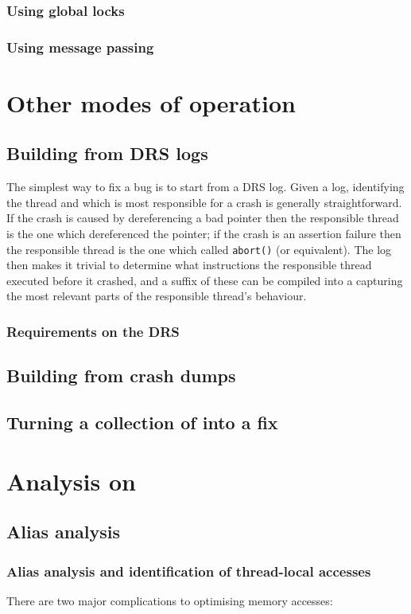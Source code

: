 \documentclass[12pt,a4paper]{book}
\begin{document}
\subsection{Using global locks}
\subsection{Using message passing}

\chapter{Other modes of operation}
\section{Building \StateMachines from DRS logs}
The simplest way to fix a bug is to start from a DRS log.
Given a log, identifying the thread and which is most responsible for a crash is generally straightforward.
If the crash is caused by dereferencing a bad pointer then the responsible thread is the one which dereferenced the pointer; if the crash is an assertion failure then the responsible thread is the one which called \verb|abort()| (or equivalent).
The log then makes it trivial to determine what instructions the responsible thread executed before it crashed, and a suffix of these can be compiled into a \StateMachine capturing the most relevant parts of the responsible thread's behaviour.


\subsection{Requirements on the DRS}
\section{Building \StateMachines from crash dumps}
\section{Turning a collection of \StateMachines into a fix}

\chapter{Analysis on \StateMachines}
\section{Alias analysis}
\subsection{Alias analysis and identification of thread-local accesses}
There are two major complications to optimising memory accesses:
\end{document}
